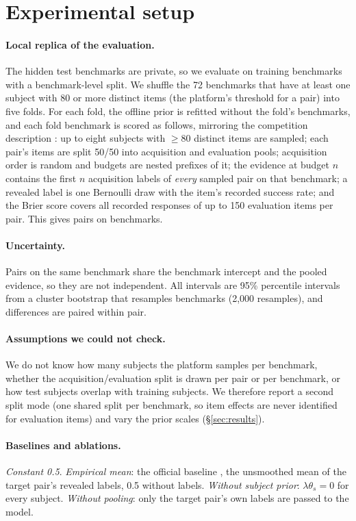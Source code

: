 \documentclass{article}
\begin{document}
\section{Experimental setup}
\label{sec:setup}

\paragraph{Local replica of the evaluation.} The hidden test benchmarks are private, so we evaluate on training benchmarks with a benchmark-level split. We shuffle the 72 benchmarks that have at least one subject with 80 or more distinct items (the platform's threshold for a pair) into five folds. For each fold, the offline prior is refitted without the fold's benchmarks, and each fold benchmark is scored as follows, mirroring the competition description \citep{paiec2026}: up to eight subjects with $\geq 80$ distinct items are sampled; each pair's items are split 50/50 into acquisition and evaluation pools; acquisition order is random and budgets are nested prefixes of it; the evidence at budget $n$ contains the first $n$ acquisition labels of \emph{every} sampled pair on that benchmark; a revealed label is one Bernoulli draw with the item's recorded success rate; and the Brier score covers all recorded responses of up to 150 evaluation items per pair. This gives \NPairs{} pairs on \NBench{} benchmarks.

\paragraph{Uncertainty.} Pairs on the same benchmark share the benchmark intercept and the pooled evidence, so they are not independent. All intervals are 95\% percentile intervals from a cluster bootstrap that resamples benchmarks (2{,}000 resamples), and differences are paired within pair.

\paragraph{Assumptions we could not check.} We do not know how many subjects the platform samples per benchmark, whether the acquisition/evaluation split is drawn per pair or per benchmark, or how test subjects overlap with training subjects. We therefore report a second split mode (one shared split per benchmark, so item effects are never identified for evaluation items) and vary the prior scales (\S\ref{sec:results}).

\paragraph{Baselines and ablations.} \emph{Constant 0.5}. \emph{Empirical mean}: the official baseline \citep{paiec_baselines_2026}, the unsmoothed mean of the target pair's revealed labels, 0.5 without labels. \emph{Without subject prior}: $\lambda\theta_s = 0$ for every subject. \emph{Without pooling}: only the target pair's own labels are passed to the model.
\end{document}
